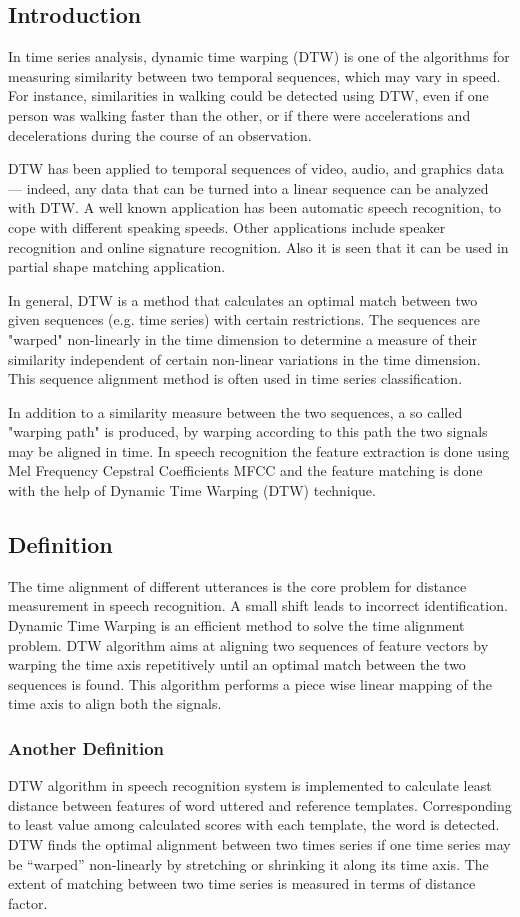 \documentclass[12pt, a4paper, twoside]{report}
\begin{document}
\subsection{Introduction} 
In time series analysis, dynamic time warping (DTW) is one of the algorithms for measuring similarity between two temporal sequences, which may vary in speed. For instance, similarities in walking could be detected using DTW, even if one person was walking faster than the other, or if there were accelerations and decelerations during the course of an observation.
\par
DTW has been applied to temporal sequences of video, audio, and graphics data — indeed, any data that can be turned into a linear sequence can be analyzed with DTW. A well known application has been automatic speech recognition, to cope with different speaking speeds. Other applications include speaker recognition and online signature recognition. Also it is seen that it can be used in partial shape matching application.
\par
In general, DTW is a method that calculates an optimal match between two given sequences (e.g. time series) with certain restrictions. The sequences are "warped" non-linearly in the time dimension to determine a measure of their similarity independent of certain non-linear variations in the time dimension. This sequence alignment method is often used in time series classification.
\par
In addition to a similarity measure between the two sequences, a so called "warping path" is produced, by warping according to this path the two signals may be aligned in time. In speech recognition the feature extraction is done using Mel Frequency Cepstral Coefficients {MFCC} and the feature matching is done with the help of Dynamic Time Warping (DTW) technique.
\subsection{Definition}
The time alignment of different utterances is the core problem for distance measurement in speech recognition. A small shift leads to incorrect identification. Dynamic Time Warping is an efficient method to solve the time alignment problem. DTW algorithm aims at aligning two sequences of feature vectors by warping the time axis repetitively until an optimal match between the two sequences is found. This algorithm performs a piece wise linear mapping of the time axis to align both the signals.
\subsubsection{Another Definition}
DTW algorithm in speech recognition system is implemented to calculate least distance between features of word uttered and reference templates. Corresponding to least value among calculated scores with each template, the word is detected. DTW finds the optimal alignment between two times series if one time series may be ``warped'' non-linearly by stretching or shrinking it along its time axis. The extent of matching between two time series is measured in terms of distance factor.
\end{document}
